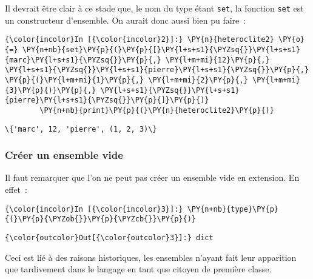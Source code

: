     Il devrait être clair à ce stade que, le nom du type étant \texttt{set},
la fonction \texttt{set} est un constructeur d'ensemble. On aurait donc
aussi bien pu faire~:

    \begin{Verbatim}[commandchars=\\\{\},frame=single,framerule=0.3mm,rulecolor=\color{cellframecolor}]
{\color{incolor}In [{\color{incolor}2}]:} \PY{n}{heteroclite2} \PY{o}{=} \PY{n+nb}{set}\PY{p}{(}\PY{p}{[}\PY{l+s+s1}{\PYZsq{}}\PY{l+s+s1}{marc}\PY{l+s+s1}{\PYZsq{}}\PY{p}{,} \PY{l+m+mi}{12}\PY{p}{,} \PY{l+s+s1}{\PYZsq{}}\PY{l+s+s1}{pierre}\PY{l+s+s1}{\PYZsq{}}\PY{p}{,} \PY{p}{(}\PY{l+m+mi}{1}\PY{p}{,} \PY{l+m+mi}{2}\PY{p}{,} \PY{l+m+mi}{3}\PY{p}{)}\PY{p}{,} \PY{l+s+s1}{\PYZsq{}}\PY{l+s+s1}{pierre}\PY{l+s+s1}{\PYZsq{}}\PY{p}{]}\PY{p}{)}
        \PY{n+nb}{print}\PY{p}{(}\PY{n}{heteroclite2}\PY{p}{)}
\end{Verbatim}


    \begin{Verbatim}[commandchars=\\\{\},frame=single,framerule=0.3mm,rulecolor=\color{cellframecolor}]
\{'marc', 12, 'pierre', (1, 2, 3)\}
\end{Verbatim}

    \hypertarget{cruxe9er-un-ensemble-vide}{%
\subsubsection{Créer un ensemble vide}\label{cruxe9er-un-ensemble-vide}}

    Il faut remarquer que l'on ne peut pas créer un ensemble vide en
extension. En effet~:

    \begin{Verbatim}[commandchars=\\\{\},frame=single,framerule=0.3mm,rulecolor=\color{cellframecolor}]
{\color{incolor}In [{\color{incolor}3}]:} \PY{n+nb}{type}\PY{p}{(}\PY{p}{\PYZob{}}\PY{p}{\PYZcb{}}\PY{p}{)}
\end{Verbatim}


\begin{Verbatim}[commandchars=\\\{\},frame=single,framerule=0.3mm,rulecolor=\color{cellframecolor}]
{\color{outcolor}Out[{\color{outcolor}3}]:} dict
\end{Verbatim}
            
    Ceci est lié à des raisons historiques, les ensembles n'ayant fait leur
apparition que tardivement dans le langage en tant que citoyen de
première classe.

